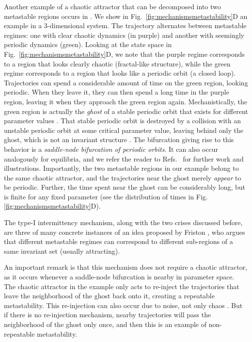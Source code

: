 Another example of a chaotic attractor that can be decomposed into two metastable regions occurs in . We show in Fig.~\ref{fig:mechanismsmetastability}D an example in a 3-dimensional system. The trajectory alternates between metastable regimes: one with clear chaotic dynamics (in purple) and another with seemingly periodic dynamics (green). Looking at the state space in Fig.~\ref{fig:mechanismsmetastability}D\supprime, we note that the purple regime corresponds to a region that looks clearly chaotic (fractal-like structure), while the green regime corresponds to a region that looks like a periodic orbit (a closed loop). Trajectories can spend a considerable amount of time on the green region, looking periodic. When they leave it, they can then spend a long time in the purple region, leaving it when they approach the green region again.
Mechanistically, the green region is actually the \textit{ghost} of a stable periodic orbit that exists for different parameter values \cite{pomeau1979intermittency, pomeau1980intermittent, strogatz2002nonlinear}. That stable periodic orbit is destroyed by a collision with an unstable periodic orbit at some critical parameter value, leaving behind only the ghost, which is not an invariant structure \cite{medeiros2016trapping}. The bifurcation giving rise to this behavior is a \textit{saddle-node bifurcation of periodic orbits}. It can also occur analogously for equilibria, and we refer the reader to Refs.~\cite{koch2023beyond, sussillo2013opening} for further work and illustrations. Importantly, the two metastable regions in our example belong to the same chaotic attractor, and the trajectories near the ghost merely \textit{appear} to be periodic. 
Further, the time spent near the ghost can be considerably long, but is finite for any fixed parameter \cite{pomeau1980intermittent} (see the distribution of times in Fig. \ref{fig:mechanismsmetastability}D\ssupprime).

The type-I intermittency mechanism, along with the two crises discussed before, are three of many concrete instances of an idea proposed by Friston \cite{friston2000transients}, who argues that different metastable regimes can correspond to different sub-regions of a same invariant set (usually attracting). 

An important remark is that this mechanism does not require a chaotic attractor, as it occurs whenever a saddle-node bifurcation is nearby in parameter space. The chaotic attractor in the example only acts to re-inject the trajectories that leave the neighborhood of the ghost back onto it, creating a repeatable metastability. This re-injection can also occur due to noise, not only chaos \cite{medeiros2016trapping}. But if there is no re-injection mechanism, nearby trajectories will pass the neighborhood of the ghost only once, and then this is an example of non-repeatable metastability.

